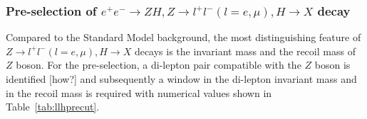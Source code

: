 \documentclass[11pt,a4paper]{cepcnote}
\begin{document}
\subsubsection{Pre-selection of $e^+e^- \rightarrow ZH, Z\rightarrow l^+l^-(l=e,\mu), H\rightarrow X$ decay}
Compared to the Standard Model background, the most distinguishing feature of $Z\rightarrow l^+l^-(l=e,\mu), H\rightarrow X$ 
decays is the invariant mass and the recoil mass of $Z$ boson. For the pre-selection, a di-lepton pair compatible with
the $Z$ boson is identified [how?] and subsequently a window in the di-lepton invariant mass and in the recoil mass
is required with numerical values shown in Table~\ref{tab:llhprecut}.
\begin{figure}[H]
	\centering
\end{figure}
\end{document}
